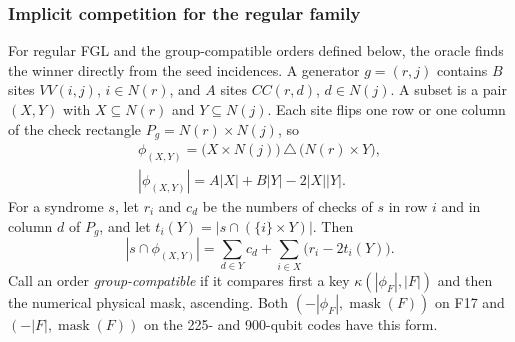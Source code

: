 \documentclass[10pt,twocolumn]{article}
\theoremstyle{definition}
\begin{document}
\subsubsection{Implicit competition for the regular family}
For regular FGL and the group-compatible orders defined below, the
oracle finds the winner directly from the seed incidences. A generator
$g=(r,j)$ contains $B$ sites $VV(i,j)$, $i\in N(r)$, and $A$ sites
$CC(r,d)$, $d\in N(j)$. A subset is a pair $(X,Y)$ with $X\subseteq N(r)$ and
$Y\subseteq N(j)$. Each site flips one row or one column of the check
rectangle $P_g=N(r)\times N(j)$, so
\begin{equation}\label{eq:rect-footprint}
\begin{gathered}
 \phi_{(X,Y)}=\bigl(X\times N(j)\bigr)\,\triangle\,\bigl(N(r)\times Y\bigr),
 \\
 |\phi_{(X,Y)}|=A|X|+B|Y|-2|X||Y| .
\end{gathered}
\end{equation}
For a syndrome $s$, let $r_i$ and $c_d$ be the numbers of checks of $s$
in row $i$ and in column $d$ of $P_g$, and let
$t_i(Y)=|s\cap(\{i\}\times Y)|$. Then
\begin{equation}\label{eq:rect-overlap}
 |s\cap\phi_{(X,Y)}|=\sum_{d\in Y}c_d
                    +\sum_{i\in X}\bigl(r_i-2t_i(Y)\bigr).
\end{equation}
Call an order \emph{group-compatible} if it compares first a key
$\kappa(|\phi_F|,|F|)$ and then the numerical physical mask, ascending.
Both
$(-|\phi_F|,\operatorname{mask}(F))$ on F17 and
$(-|F|,\operatorname{mask}(F))$ on the 225- and 900-qubit codes
have this form.
\end{document}
